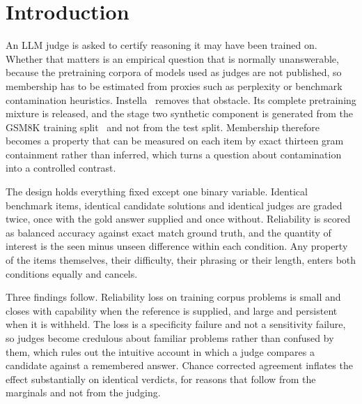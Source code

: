 \documentclass{article}
\begin{document}
\section{Introduction}

An LLM judge is asked to certify reasoning it may have been trained on. Whether that matters
is an empirical question that is normally unanswerable, because the pretraining corpora of
models used as judges are not published, so membership has to be estimated from proxies such
as perplexity or benchmark contamination heuristics. Instella~\citep{instella2025} removes
that obstacle. Its complete pretraining mixture is released, and the stage two synthetic
component is generated from the GSM8K training split~\citep{cobbe2021gsm8k} and not from the
test split. Membership therefore becomes a property that can be measured on each item by
exact thirteen gram containment rather than inferred, which turns a question about
contamination into a controlled contrast.

The design holds everything fixed except one binary variable. Identical benchmark items,
identical candidate solutions and identical judges are graded twice, once with the gold
answer supplied and once without. Reliability is scored as balanced accuracy against exact
match ground truth, and the quantity of interest is the seen minus unseen difference within
each condition. Any property of the items themselves, their difficulty, their phrasing or
their length, enters both conditions equally and cancels.

Three findings follow. Reliability loss on training corpus problems is small and closes with
capability when the reference is supplied, and large and persistent when it is withheld. The
loss is a specificity failure and not a sensitivity failure, so judges become credulous
about familiar problems rather than confused by them, which rules out the intuitive account
in which a judge compares a candidate against a remembered answer. Chance corrected
agreement inflates the effect substantially on identical verdicts, for reasons that follow
from the marginals and not from the judging.
\end{document}
